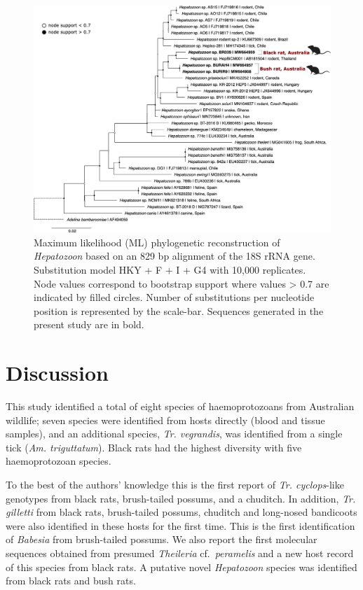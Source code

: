 \documentclass[a4paper, nobind]{templates/ociamthesis}
\begin{document}
\begin{figure}
\includegraphics[width=0.95\linewidth]{figures/ms-figs/Ch4-hepattree} \caption[Phylogeny of \textit{Hepatozoon} species.]{Maximum likelihood (ML) phylogenetic reconstruction of \textit{Hepatozoon} based on an 829 bp alignment of the 18S rRNA gene. Substitution model HKY + F + I + G4 with 10,000 replicates. Node values correspond to bootstrap support where values > 0.7 are indicated by filled circles. Number of substitutions per nucleotide position is represented by the scale-bar. Sequences generated in the present study are in bold.}\label{fig:F4hepattree}
\end{figure}

\hypertarget{discussion-1}{%
\section{Discussion}\label{discussion-1}}

This study identified a total of eight species of haemoprotozoans from Australian wildlife; seven species were identified from hosts directly (blood and tissue samples), and an additional species, \emph{Tr. vegrandis}, was identified from a single tick (\emph{Am. triguttatum}). Black rats had the highest diversity with five haemoprotozoan species.

To the best of the authors' knowledge this is the first report of \emph{Tr. cyclops}-like genotypes from black rats, brush-tailed possums, and a chuditch.
In addition, \emph{Tr. gilletti} from black rats, brush-tailed possums, chuditch and long-nosed bandicoots were also identified in these hosts for the first time. This is the first identification of \emph{Babesia} from brush-tailed possums. We also report the first molecular sequences obtained from presumed \emph{Theileria} cf.~\emph{peramelis} and a new host record of this species from black rats. A putative novel \emph{Hepatozoon} species was identified from black rats and bush rats.
\end{document}

